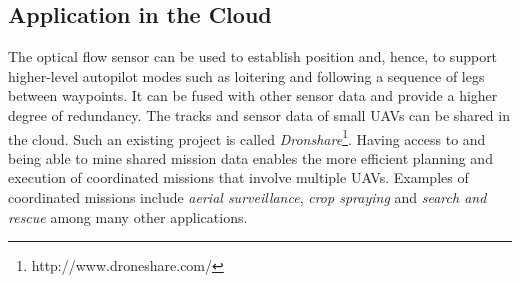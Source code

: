 \documentclass[paper=letter, fontsize=11pt]{scrartcl}
\numberwithin{equation}{section}
\numberwithin{figure}{section}
\numberwithin{table}{section}
\begin{document}
\subsection{Application in the Cloud}
\label{sec:application_cloud}
\par
The optical flow sensor can be used to establish position and, hence, to
support higher-level autopilot modes such as loitering and following a
sequence of legs between waypoints. It can be fused with other sensor data
and provide a higher degree of redundancy. The tracks and sensor data of
small \acp{UAV} can be shared in the cloud. Such an existing project is
called {\em Dronshare}\footnote{http://www.droneshare.com/}. Having access
to and being able to mine shared mission data enables the more
efficient planning and execution of coordinated missions that involve
multiple \acp{UAV}. Examples of coordinated missions include {\em aerial
surveillance}, {\em crop spraying} and {\em search and rescue} among many
other applications.

\clearpage
\label{appendix}


\clearpage
\label{bibliography}


\end{document}
